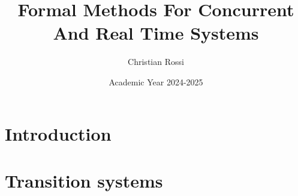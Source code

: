 \documentclass[12pt, a4paper]{report}
\title{\textbf{Formal Methods For Concurrent And Real Time Systems}}
\author{Christian Rossi}
\date{Academic Year 2024-2025}
\begin{document}
    \maketitle

    

    \cleardoublepage{}

    \tableofcontents

    \cleardoublepage{}

    \chapter{Introduction}
    
    
    

    \chapter{Transition systems}
    
    
    
    
    
    

\end{document}
